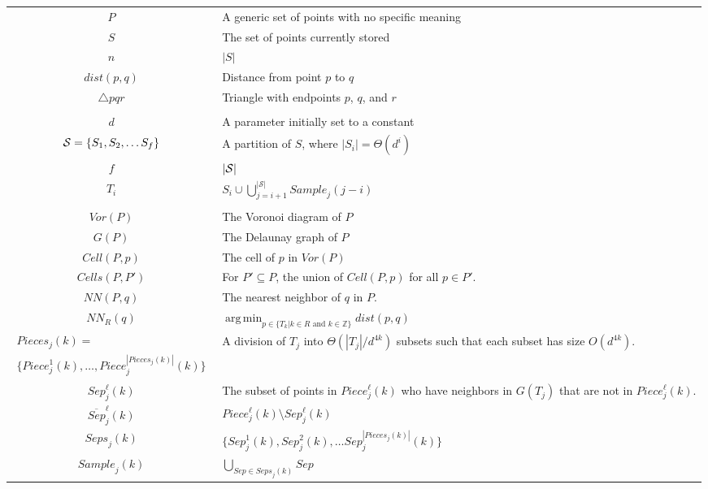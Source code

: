 \documentclass[12pt,a4paper,USenglish,cleveref, autoref, thm-restate]{article}
\newcommand{\Cell}{\mathit{Cell}}
\newcommand{\Cells}{\mathit{Cells}}
\newcommand{\Sample}{\mathit{Sample}}
\newcommand{\Piece}{\mathit{Piece}}
\newcommand{\Pieces}{\mathit{Pieces}}
\newcommand{\Sep}{\mathit{Sep}}
\newcommand{\Seps}{\mathit{Seps}}
\newcommand{\NN}{\mathit{NN}}
\newcommand{\mcS}{\mathcal{S}}
\newcommand{\Voron}{\mathit{Vor}}
\DeclareMathOperator*{\argmin}{arg\,min}
\newcommand{\Cell}{\mathit{Cell}}
\newcommand{\Cells}{\mathit{Cells}}
\newcommand{\Sample}{\mathit{Sample}}
\newcommand{\Piece}{\mathit{Piece}}
\newcommand{\Pieces}{\mathit{Pieces}}
\newcommand{\Sep}{\mathit{Sep}}
\newcommand{\Seps}{\mathit{Seps}}
\newcommand{\NN}{\mathit{NN}}
\newcommand{\mcS}{\mathcal{S}}
\newcommand{\Voron}{\mathit{Vor}}
\DeclareMathOperator*{\argmin}{arg\,min}
\newcommand{\Cell}{\mathit{Cell}}
\newcommand{\Cells}{\mathit{Cells}}
\newcommand{\Sample}{\mathit{Sample}}
\newcommand{\Piece}{\mathit{Piece}}
\newcommand{\Pieces}{\mathit{Pieces}}
\newcommand{\Sep}{\mathit{Sep}}
\newcommand{\Seps}{\mathit{Seps}}
\newcommand{\NN}{\mathit{NN}}
\newcommand{\mcS}{\mathcal{S}}
\newcommand{\Voron}{\mathit{Vor}}
\DeclareMathOperator*{\argmin}{arg\,min}
\begin{document}





\begin{table} \small 
\begin{tabular}{|c|p{3.5in}|}\hline
$P$ & A generic set of points with no specific meaning \\
$S$ & The set of points currently stored \\
$n$ & $|S|$ \\
$dist(p,q)$ & Distance from point $p$ to $q$\\
$\triangle pqr$ & Triangle with endpoints $p$, $q$, and $r$\\
    &       \\
$d$ & A parameter initially set to a constant\\
${\cal S}=\{ S_1, S_2, \ldots S_{f} \}$ & A partition of $S$, where $|S_i|=\Theta(d^i)$ \\  
$f$ & $|{\cal S}|$\\
$T_i$ & $S_i \cup \bigcup_{j=i+1}^{|\mcS|} \Sample_j(j-i)$\\
      &    \\
$\Voron(P)$ & The Voronoi diagram of $P$ \\
$G(P)$ &  The Delaunay graph of $P$ \\
$\Cell(P,p)$ & The cell of $p$ in $\Voron(P)$ \\
$\Cells(P,P')$ & For $P' \subseteq P$, the union of $\Cell(P,p)$ for all $p \in P'$. \\
$\NN(P,q)$ & The nearest neighbor of $q$ in $P$.\\
$\NN_R(q)$ & $\argmin_{p\in \{ T_k|k\in R  \text{ and } k \in \mathbb{Z}\}}dist(p,q)$\\
$\begin{array}{c}
\Pieces_j(k) = \\ \{\Piece^1_j(k),  \ldots, \Piece^{|\Pieces_j(k)|}_j(k)\}
\end{array}$
& A division of $T_j$ into $\Theta(|T_j|/d^{4k})$ subsets such that each subset has size $O(d^{4k})$.
\\
$\Sep^\ell_j(k)$ &  The subset of points in $\Piece^\ell_j(k)$ who have neighbors in $G(T_j)$ that are not in $\Piece^\ell_j(k)$.  
\\
$\overline{Sep}_j^\ell(k)$ & $\Piece_j^\ell(k) \setminus \Sep_j^\ell(k)$
\\
$\Seps_j(k)$ & $\{\Sep_j^1(k), \Sep^2_j(k), \ldots  \Sep^{|\Pieces_j(k)|}_j(k)\}$
\\
$\Sample_j(k)$ & $\bigcup_{Sep \in \Seps_j(k)} Sep$ \\

\end{tabular}
\end{table}
\end{document}

